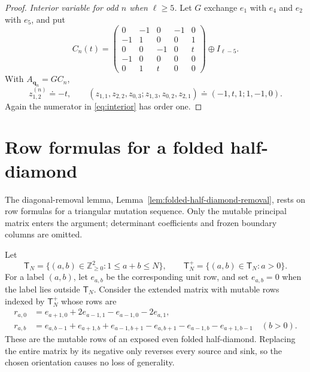 \documentclass[11pt]{amsart}
\theoremstyle{definition}
\theoremstyle{remark}
\begin{document}
\begin{proof}
\smallskip
\noindent\emph{Interior variable for odd $n$ when $\ell\ge5$.}
Let $G$ exchange $e_1$ with $e_4$ and $e_2$ with $e_5$,
and put
\[
 C_n(t)=
 \begin{pmatrix}
  0&-1&0&-1&0\\
  -1&1&0&0&1\\
  0&0&-1&0&t\\
  -1&0&0&0&0\\
  0&1&t&0&0
 \end{pmatrix}\oplus I_{\ell-5}.
\]
With $A_{\mathbf q_n}=GC_n$,
\[ z_{1,2}^{(n)}\doteq-t, \qquad (z_{1,1},z_{2,2},z_{0,3};z_{1,3},z_{0,2},z_{2,1}) \doteq(-1,t,1;1,-1,0). \]
Again the numerator in \eqref{eq:interior} has order one.
\end{proof}

\section{Row formulas for a folded half-diamond}
\label{app:triangular-mutation}

The diagonal-removal lemma, Lemma~\ref{lem:folded-half-diamond-removal},
rests on row formulas for a triangular mutation sequence.  Only the mutable
principal matrix enters the argument; determinant coefficients and frozen
boundary columns are omitted.

Let
\[ \mathsf T_N=\{(a,b)\in\mathbb Z_{\ge0}^2:1\le a+b\le N\}, \qquad \mathsf T_N^+=\{(a,b)\in\mathsf T_N:a>0\}. \]
For a label $(a,b)$, let $e_{a,b}$ be the corresponding unit row, and set
$e_{a,b}=0$ when the label lies outside $\mathsf T_N$.  Consider the
extended matrix with mutable rows indexed by $\mathsf T_N^+$ whose rows are
\begin{align}
 r_{a,0}
 &=e_{a+1,0}+2e_{a-1,1}-e_{a-1,0}-2e_{a,1},
 \label{eq:appendix-base-row}\\
 r_{a,b}
 &=e_{a,b-1}+e_{a+1,b}+e_{a-1,b+1}
   -e_{a,b+1}-e_{a-1,b}-e_{a+1,b-1}
 \quad(b>0).
 \label{eq:appendix-interior-row}
\end{align}
These are the mutable rows of an exposed even folded half-diamond.
Replacing the entire matrix by its negative only reverses every source
and sink, so the chosen orientation causes no loss of generality.
\end{document}
